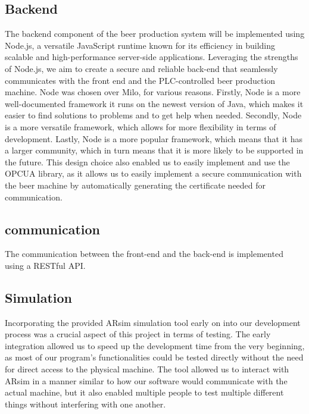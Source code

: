 \subsection{Backend}
The backend component of the beer production system will be implemented using Node.js, a versatile JavaScript runtime known for its efficiency in building scalable and high-performance server-side applications. Leveraging the strengths of Node.js, we aim to create a secure and reliable back-end that seamlessly communicates with the front end and the PLC-controlled beer production machine.
Node was chosen over Milo, for various reasons. Firstly, Node is a more well-documented framework it runs on the newest version of Java, which makes it easier to find solutions to problems and to get help when needed. Secondly, Node is a more versatile framework, which allows for more flexibility in terms of development. Lastly, Node is a more popular framework, which means that it has a larger community, which in turn means that it is more likely to be supported in the future. \newline
This design choice also enabled us to easily implement and use the OPCUA library, as it allows us to easily implement a secure communication with the beer machine by automatically generating the certificate needed for communication. \newline

\subsection{communication}
The communication between the front-end and the back-end is implemented using a RESTful API. 

\subsection{Simulation}
Incorporating the provided ARsim simulation tool early on into our development process was a crucial aspect of this project in terms of testing. 
The early integration allowed us to speed up the development time from the very beginning, as most of our program's functionalities could be tested directly without the need for direct access to the physical machine.
The tool allowed us to interact with ARsim in a manner similar to how our software would communicate with the actual machine, but it also enabled multiple people to test multiple different things without interfering with one another.

